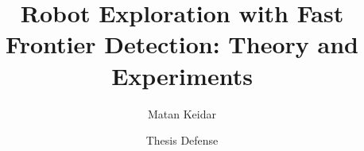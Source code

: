 \documentclass{beamer}
\title{Robot Exploration with Fast Frontier Detection: Theory and Experiments}
\author{Matan Keidar}
\institute[Universities of]
{
MAVERICK Group \\ Department of Computer Science\\
Bar-Ilan University
}
\date{Thesis Defense}
\begin{document}
\begin{frame}
\titlepage
\end{frame}











\appendix





% 
\end{document}
